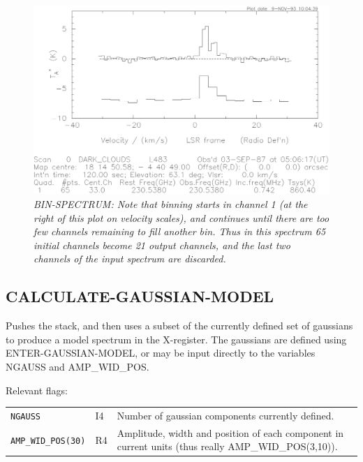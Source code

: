 \documentclass[11pt,twoside]{report}
\begin{document}
\begin{figure}[htbp]
\begin{center}
\includegraphics[scale=0.65]{bin-spec.ps}
\protect\parbox{5.5in}
{\caption[BIN]
{\sl
BIN-SPECTRUM: Note that binning starts in channel 1 (at the right of this
plot on velocity scales), and continues until there are too few channels
remaining to fill another bin. Thus in this spectrum 65 initial channels
become 21 output channels, and the last two channels of the input spectrum
are discarded.
\label{BIN}
}
}
\end{center}
\end{figure}

\subsection{CALCULATE-GAUSSIAN-MODEL} 

Pushes the stack, and then uses a subset of the currently defined set of
gaussians to produce a model spectrum in the X-register. The gaussians
are defined using ENTER-GAUSSIAN-MODEL, or may be input directly to the
variables NGAUSS and AMP\_WID\_POS.

Relevant flags:\\
\begin{tabular}{lll}
  \verb+NGAUSS+          & I4 & Number of gaussian components currently 
                                defined. \\
  \verb+AMP_WID_POS(30)+ & R4 & \parbox[t]{4in}
                                {Amplitude, width and position of each
                                component in current units (thus really
                                AMP\_WID\_POS(3,10)).}
\end{tabular}
\end{document}
